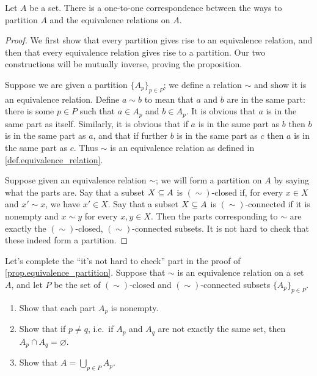 \documentclass[7Sketches]{subfiles}
\begin{document}
\begin{proposition}%
\label{prop.equivalence_partition}%
Let $A$ be a set. There is a one-to-one correspondence between the ways to partition $A$ and the equivalence relations on $A$.
\end{proposition}
\begin{proof}
We first show that every partition gives rise to an equivalence relation, and then that every equivalence relation gives rise to a partition. Our two constructions will be mutually inverse, proving the proposition.

Suppose we are given a partition $\{A_p\}_{p\in P}$; we define a relation $\sim$ and show it is an equivalence relation. Define $a\sim b$ to mean that $a$ and $b$ are in the same part: there is some $p\in P$ such that $a\in A_p$ and $b\in A_p$. It is obvious that $a$ is in the same part as itself. Similarly, it is obvious that if $a$ is in the same part as $b$ then $b$ is in the same part as $a$, and that if further $b$ is in the same part as $c$ then $a$ is in the same part as $c$. Thus $\sim$ is an equivalence relation as defined in \cref{def.equivalence_relation}.

Suppose given an equivalence relation $\sim$; we will form a partition on $A$ by saying what the parts are. Say that a subset $X\ss A$ is $(\sim)$-closed if, for every $x\in X$ and $x'\sim x$, we have $x'\in X$. Say that a subset $X\ss A$ is $(\sim)$-connected if it is nonempty and $x\sim y$ for every $x,y\in X$. Then the parts corresponding to $\sim$ are exactly the $(\sim)$-closed, $(\sim)$-connected subsets. It is not hard to check that these indeed form a partition.%
\end{proof}

\begin{exercise}%
\label{exc.equiv_part_proof}
Let's complete the ``it's not hard to check'' part in the proof of \cref{prop.equivalence_partition}. Suppose that $\sim$ is
an equivalence relation on a set $A$, and let $P$ be the set of $(\sim)$-closed and
$(\sim)$-connected subsets $\{A_p\}_{p\in P}$.
\begin{enumerate}
	\item Show that each part $A_p$ is nonempty.
	\item Show that if $p\neq q$, i.e.\ if $A_p$ and $A_q$ are not exactly the same set, then $A_p\cap A_q=\varnothing$.
	\item Show that $A=\bigcup_{p\in P}A_p$.
	\qedhere
\qedhere
\end{enumerate}
\end{exercise}
\end{document}
